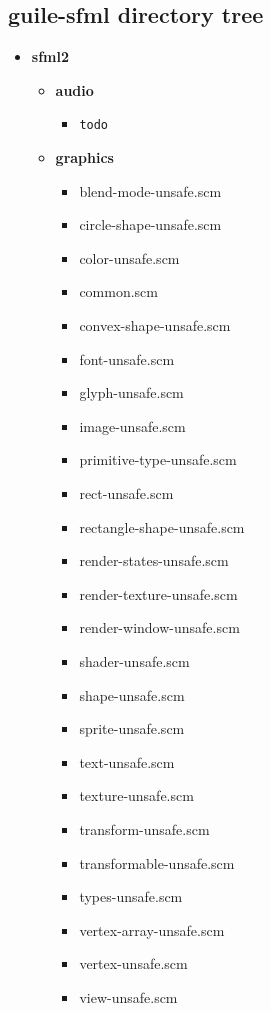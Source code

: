 \documentclass[latterpaper, leqno]{article}
\begin{document}
\subsection*{guile-sfml directory tree}
\begin{itemize}

\item \textbf{sfml2}
  \begin{itemize}

  \item \textbf{audio}
    \begin{itemize}
    \item \texttt{todo}
    \end{itemize}

  \item \textbf{graphics}
    \begin{itemize}
    \item blend-mode-unsafe.scm
    \item circle-shape-unsafe.scm
    \item color-unsafe.scm
    \item common.scm
    \item convex-shape-unsafe.scm
    \item font-unsafe.scm
    \item glyph-unsafe.scm
    \item image-unsafe.scm
    \item primitive-type-unsafe.scm
    \item rect-unsafe.scm
    \item rectangle-shape-unsafe.scm
    \item render-states-unsafe.scm
    \item render-texture-unsafe.scm
    \item render-window-unsafe.scm
    \item shader-unsafe.scm
    \item shape-unsafe.scm
    \item sprite-unsafe.scm
    \item text-unsafe.scm
    \item texture-unsafe.scm
    \item transform-unsafe.scm
    \item transformable-unsafe.scm
    \item types-unsafe.scm
    \item vertex-array-unsafe.scm
    \item vertex-unsafe.scm
    \item view-unsafe.scm
    \end{itemize}


\end{itemize}
\end{itemize}
\end{document}
